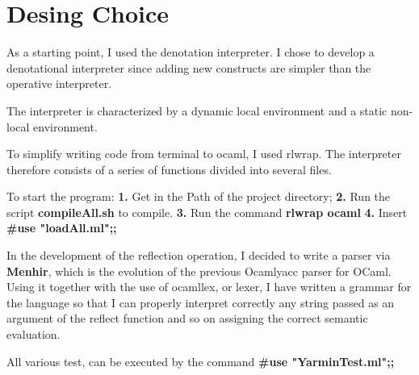 \chapter{ Desing Choice }


As a starting point, I used the denotation interpreter.
I chose to develop a denotational interpreter since adding
new constructs are simpler than the operative interpreter.\newline

The interpreter is characterized by a dynamic local environment and a static non-local environment.\newline

To simplify writing code from terminal to ocaml, I used rlwrap.\newline
The interpreter therefore consists of a series of functions divided into several files.

To start the program:
\newline
\textbf{1.} Get in the Path of the project directory;\newline
\textbf{2.} Run the script \textbf{compileAll.sh} to compile.\newline
\textbf{3.} Run the command  \textbf{rlwrap ocaml}\newline
\textbf{4.} Insert  \textbf{\#use "loadAll.ml";;}\newline



In the development of the reflection operation, I decided to write a
parser via \textbf{Menhir}, which is the evolution of the previous Ocamlyacc parser for OCaml.
Using it together with the use of ocamllex, or lexer, I have written a grammar
for the language so that I can properly interpret correctly any string passed as an argument of the reflect function and so on assigning the correct semantic evaluation.

All various test, can be executed by the command \textbf{\#use "YarminTest.ml";;}

\newpage
